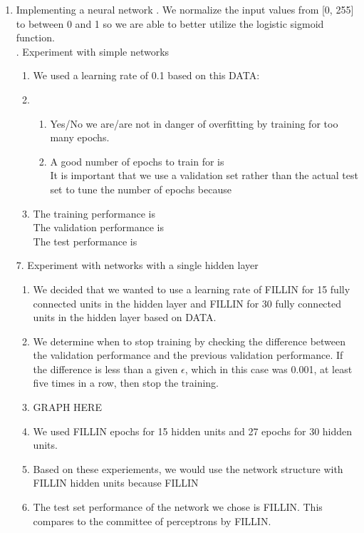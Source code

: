 \documentclass[11pt]{article}
\begin{document}
\begin{enumerate}
\begin{enumerate}
	\end{enumerate}
\item Implementing a neural network
\newline
{}. We normalize the input values from [0, 255] to between 0 and 1 so we are able to better utilize the logistic sigmoid function.\\ 
. Experiment with simple networks
\begin{enumerate}
\item We used a learning rate of 0.1 based on this DATA:
\item 
\begin{enumerate}
\item Yes/No we are/are not in danger of overfitting by training for too many epochs.
\item A good number of epochs to train for is
\\It is important that we use a validation set rather than the actual test set to tune the number of epochs because
\end{enumerate}
\item The training performance is
\\ The validation performance is
\\ The test performance is
\end{enumerate} 
7. Experiment with networks with a single hidden layer
\begin{enumerate}
\item We decided that we wanted to use a learning rate of FILLIN for 15 fully connected units in the hidden layer and FILLIN for 30 fully connected units in the hidden layer based on DATA.
\item We determine when to stop training by checking the difference between the validation performance and the previous validation performance. If the difference is less than a given $\epsilon$, which in this case was 0.001, at least five times in a row, then stop the training.
\item GRAPH HERE
\item We used FILLIN epochs for 15 hidden units and 27 epochs for 30 hidden units.
\item Based on these experiements, we would use the network structure with FILLIN hidden units because FILLIN
\item The test set performance of the network we chose is FILLIN. This compares to the committee of perceptrons by FILLIN.
\end{enumerate}

\end{enumerate}
\end{document}
